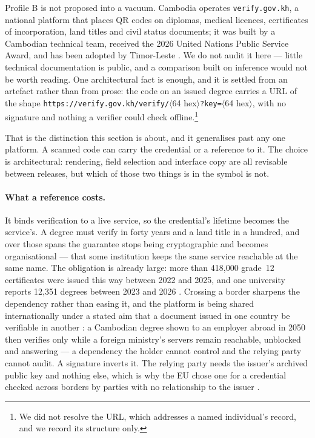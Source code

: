 \documentclass[10pt,a4paper,twocolumn]{article}
\newcommand{\code}[1]{\texttt{\small #1}}
\begin{document}
Profile B is not proposed into a vacuum. Cambodia operates \code{verify.gov.kh},
a national platform that places QR codes on diplomas, medical licences,
certificates of incorporation, land titles and civil status documents; it was
built by a Cambodian technical team, received the 2026 United Nations Public
Service Award, and has been adopted by Timor-Leste
\citep{cambodianess2026verifygov,khmertimes2026verifygov}. We do not audit it
here --- little technical documentation is public, and a comparison built on
inference would not be worth reading. One architectural fact is enough, and it
is settled from an artefact rather than from prose: the code on an issued degree
carries a URL of the shape \code{https://\allowbreak verify.gov.kh/\allowbreak verify/}$\langle$64
hex$\rangle$\code{?key=}$\langle$64 hex$\rangle$, with no signature and nothing a
verifier could check offline.\footnote{We did not resolve the URL, which
addresses a named individual's record, and we record its structure only.}

That is the distinction this section is about, and it generalises past any one
platform. A scanned code can carry the credential or a reference to it. The
choice is architectural: rendering, field selection and interface copy are all
revisable between releases, but which of those two things is in the symbol is
not.

\paragraph{What a reference costs.} It binds verification to a live service, so
the credential's lifetime becomes the service's. A degree must verify in forty
years and a land title in a hundred, and over those spans the guarantee stops
being cryptographic and becomes organisational --- that some institution keeps
the same service reachable at the same name. The obligation is already large:
more than 418{,}000 grade~12 certificates were issued this way between 2022 and
2025, and one university reports 12{,}351 degrees between 2023 and 2026
\citep{khmertimes2026verifygov}. Crossing a border sharpens the dependency
rather than easing it, and the platform is being shared internationally under a
stated aim that a document issued in one country be verifiable in another
\citep{khmertimes2026verifygov}: a Cambodian degree shown to an employer abroad
in 2050 then verifies only while a foreign ministry's servers remain reachable,
unblocked and answering --- a dependency the holder cannot control and the
relying party cannot audit. A signature inverts it. The relying party needs the
issuer's archived public key and nothing else, which is why the EU chose one for
a credential checked across borders by parties with no relationship to the
issuer \citep{eudcc2021}.
\end{document}
